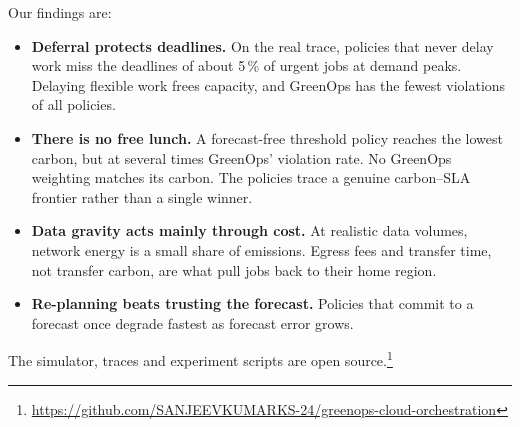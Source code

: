 Our findings are:
\begin{itemize}
\item \textbf{Deferral protects deadlines.} On the real trace, policies
  that never delay work miss the deadlines of about 5\,\% of urgent jobs
  at demand peaks. Delaying flexible work frees capacity, and GreenOps
  has the fewest violations of all policies.
\item \textbf{There is no free lunch.} A forecast-free threshold policy
  reaches the lowest carbon, but at several times GreenOps' violation
  rate. No GreenOps weighting matches its carbon. The policies trace a
  genuine carbon--SLA frontier rather than a single winner.
\item \textbf{Data gravity acts mainly through cost.} At realistic data
  volumes, network energy is a small share of emissions. Egress fees
  and transfer time, not transfer carbon, are what pull jobs back to
  their home region.
\item \textbf{Re-planning beats trusting the forecast.} Policies that
  commit to a forecast once degrade fastest as forecast error grows.
\end{itemize}
The simulator, traces and experiment scripts are open
source.\footnote{\url{https://github.com/SANJEEVKUMARKS-24/greenops-cloud-orchestration}}

